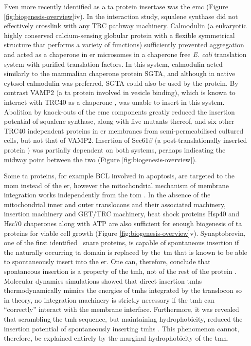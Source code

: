 Even more recently identified as a \gls{ta} protein insertase was the \gls{emc} \cite{Guna2018a} (Figure \ref{fig:biogenesis-overview}iv).
In the interaction study, squalene synthase did not effectively crosslink with any TRC pathway machinery.
Calmodulin (a eukaryotic highly conserved calcium\--sensing globular protein with a flexible symmetrical structure that performs a variety of functions) sufficiently prevented aggregation and acted as a chaperone in \gls{er} microsomes in a chaperone free \textit{E. coli} translation system with purified translation factors.
In this system, calmodulin acted similarly to the mammalian chaperone protein SGTA, and although in native cytosol calmodulin was preferred, SGTA could also be used by the protein.
By contrast VAMP2 (a \gls{ta} protein involved in vesicle binding), which is known to interact with TRC40 as a chaperone \cite{Shao2017}, was unable to insert in this system.
Abolition by knock\--outs of the \gls{emc} components greatly reduced the insertion potential of squalene synthase, along with five mutants thereof, and six other TRC40 independent proteins in \gls{er} membranes from semi-permeabilised cultured cells, but not that of VAMP2.
Insertion of Sec61$\beta$ (a post\--translationally inserted protein ) was partially dependent on both systems, perhaps indicating the midway point between the two \cite{Guna2018a} (Figure \ref{fig:biogenesis-overview}).

Some \gls{ta} proteins, for example BCL involved in apoptosis, are targeted to the \gls{mom} instead of the \gls{er}, however the mitochondrial mechanism of membrane integration works independently from the \gls{tom} \cite{Setoguchi2006, Kemper2008}.
In the absence of the mitochondrial inner and outer translocons and their associated machinery, insertion machinery and GET/TRC machinery, heat shock proteins Hsp40 and Hsc70 chaperones along with ATP are also sufficient for enough biogenesis of \gls{ta} proteins for viable cell growth \cite{Rabu2008, Rabu2009, Ngosuwan2003, Colombo2009, Kemper2008, Meineke2008, Setoguchi2006, Kemper2008} (Figure \ref{fig:biogenesis-overview}v).
Synaptobrevin, one of the first identified~ \gls{snare} proteins, is capable of spontaneous insertion if the naturally occurring \gls{ta} domain is replaced by the~\gls{tm} that is known to be able to spontaneously insert into the \gls{er}.
One can, therefore, conclude that spontaneous insertion is a property of the \gls{tmh}, not of the rest of the protein \cite{Nordlund2014}.
Molecular dynamics simulations showed that direct insertion \gls{tmh}s thermodynamically mimics the energies of \gls{tmh}s integrated by the translocon \cite{Ulmschneider2014} so in theory, no integration machinery is strictly necessary if the \gls{tmh} can ``correctly'' interact with the membrane interface.
Furthermore, it was revealed that scrambling the \gls{tmh} sequence, but maintaining hydrophobicity, reduced the insertion potential of spontaneously inserting \gls{tmh}s \cite{Brambillasca2006}.
This phenomenon cannot, therefore, be explained entirely by the marginal hydrophobicity of the \gls{tmh}.


